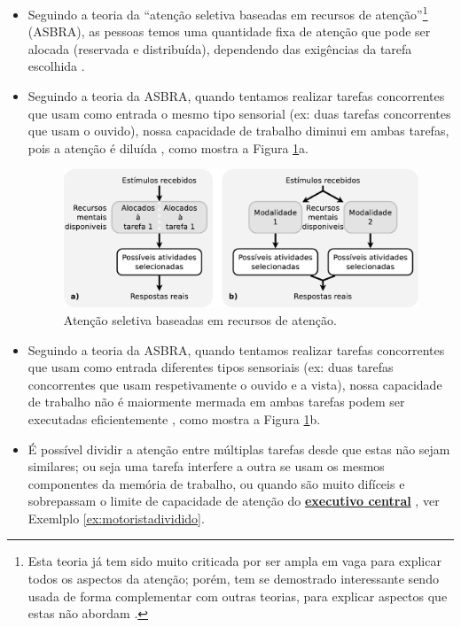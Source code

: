 \begin{itemize}
\item Seguindo a teoria da 
``atenção seletiva baseadas em recursos de atenção''\footnote{\label{footnote:ASBRA} Esta
teoria já tem sido muito criticada por ser ampla em vaga para explicar todos os aspectos da atenção;
porém, tem se demostrado interessante sendo usada de forma complementar com outras teorias,
para explicar aspectos que estas não abordam \cite[pp. 139-140]{sternbergpsicologia}.} (ASBRA),
as pessoas temos uma quantidade fixa de atenção que pode ser alocada (reservada e distribuída),
dependendo das exigências da tarefa escolhida
\cite[pp. 139]{sternbergpsicologia}  \cite{navon1979economy}.

\item Seguindo a teoria da ASBRA, 
quando tentamos realizar  tarefas concorrentes que usam como entrada o mesmo tipo sensorial 
(ex: duas tarefas concorrentes que usam o ouvido),
nossa capacidade de trabalho diminui em ambas tarefas, pois a atenção é diluída 
\cite[pp. 139]{sternbergpsicologia}  \cite{navon1979economy},
como mostra a  Figura \ref{fig:memory-attention}a.
\begin{figure}[!h]
  \centering
    \includegraphics[width=\textwidth]{chapters/cap-learning/memory-attention.eps}
\caption{Atenção seletiva baseadas em recursos de atenção.}
\label{fig:memory-attention}
\end{figure}

\item Seguindo a teoria da ASBRA, 
quando tentamos realizar  tarefas concorrentes que usam como entrada diferentes tipos sensoriais 
(ex: duas tarefas concorrentes que usam respetivamente o ouvido e a vista),
nossa capacidade de trabalho não é maiormente mermada em ambas tarefas podem ser executadas eficientemente 
\cite[pp. 139, 140]{sternbergpsicologia} \cite{navon1979economy},
como mostra a  Figura \ref{fig:memory-attention}b.

\item É possível dividir a atenção entre múltiplas tarefas desde que estas não sejam similares;
ou seja uma tarefa interfere a outra se usam os mesmos componentes da memória de trabalho,
ou quando são muito difíceis e sobrepassam o limite de capacidade de atenção do 
\hyperref[reflabel:executivocentral]{\textbf{executivo central}} 
\cite[pp. 108]{pake2019psicologia} \cite[pp. 190]{eysenck2017manual}, 
ver Exemlplo \ref{ex:motoristadividido}.


\end{itemize}

